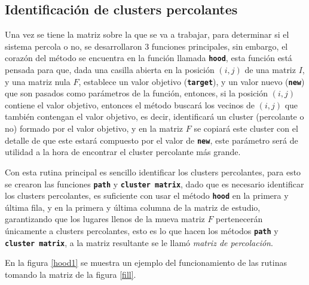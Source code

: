 \documentclass[11pt,twocolumn]{article}
\begin{document}
\subsection{\textbf{Identificación de clusters percolantes}}

Una vez se tiene la matriz sobre la que se va a trabajar, para determinar si el sistema percola o no, se desarrollaron 3 funciones principales, sin embargo, el corazón del método se encuentra en la función llamada \texttt{\textbf{hood}}, esta función está pensada para que, dada una casilla abierta en la posición $(i,j)$ de una matriz $I$, y una matriz nula $F$, establece un valor objetivo (\texttt{\textbf{target}}), y un valor nuevo (\texttt{\textbf{new}}) que son pasados como parámetros de la función, entonces, si la posición $(i,j)$ contiene el valor objetivo, entonces el método buscará los vecinos de $(i,j)$ que también contengan el valor objetivo, es decir, identificará un cluster (percolante o no) formado por el valor objetivo, y en la matriz $F$ se copiará este cluster con el detalle de que este estará compuesto por el valor de \texttt{\textbf{new}}, este parámetro será de utilidad a la hora de encontrar el cluster percolante más grande.
\vspace{0.2 cm}

Con esta rutina principal es sencillo identificar los clusters percolantes, para esto se crearon las funciones \texttt{\textbf{path}} y \texttt{\textbf{cluster matrix}}, dado que es necesario identificar los clusters percolantes, es suficiente con usar el método \texttt{\textbf{hood}} en la primera y última fila, y en la primera y última columna de la matriz de estudio, garantizando que los lugares llenos de la mueva matriz $F$ pertenecerán únicamente a clusters percolantes, esto es lo que hacen los métodos \texttt{\textbf{path}} y \texttt{\textbf{cluster matrix}}, a la matriz resultante se le llamó \textit{matriz de percolación}.
\vspace{0.2 cm}

En la figura \ref{hood1} se muestra un ejemplo del funcionamiento de las rutinas tomando la matriz de la figura \ref{fill}.
\end{document}
